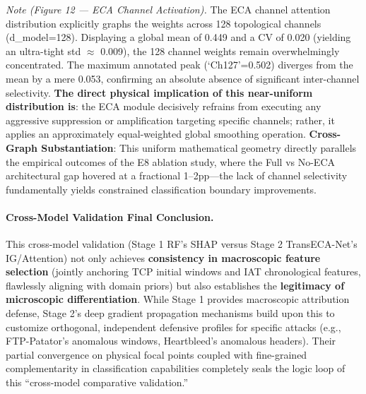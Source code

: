 \documentclass[sigconf]{acmart}
\begin{document}
\textit{Note (Figure 12 --- ECA Channel Activation).} The ECA channel attention distribution explicitly graphs the weights across 128 topological channels (d\_model=128). Displaying a global mean of 0.449 and a CV of 0.020 (yielding an ultra-tight std $\approx$ 0.009), the 128 channel weights remain overwhelmingly concentrated. The maximum annotated peak (`Ch127'=0.502) diverges from the mean by a mere 0.053, confirming an absolute absence of significant inter-channel selectivity. \textbf{The direct physical implication of this near-uniform distribution is}: the ECA module decisively refrains from executing any aggressive suppression or amplification targeting specific channels; rather, it applies an approximately equal-weighted global smoothing operation. \textbf{Cross-Graph Substantiation}: This uniform mathematical geometry directly parallels the empirical outcomes of the E8 ablation study, where the Full vs No-ECA architectural gap hovered at a fractional 1--2pp---the lack of channel selectivity fundamentally yields constrained classification boundary improvements.

\paragraph{Cross-Model Validation Final Conclusion.}
This cross-model validation (Stage 1 RF's SHAP versus Stage 2 TransECA-Net's IG/Attention) not only achieves \textbf{consistency in macroscopic feature selection} (jointly anchoring TCP initial windows and IAT chronological features, flawlessly aligning with domain priors) but also establishes the \textbf{legitimacy of microscopic differentiation}. While Stage 1 provides macroscopic attribution defense, Stage 2's deep gradient propagation mechanisms build upon this to customize orthogonal, independent defensive profiles for specific attacks (e.g., FTP-Patator's anomalous windows, Heartbleed's anomalous headers). Their partial convergence on physical focal points coupled with fine-grained complementarity in classification capabilities completely seals the logic loop of this ``cross-model comparative validation.''
\end{document}
